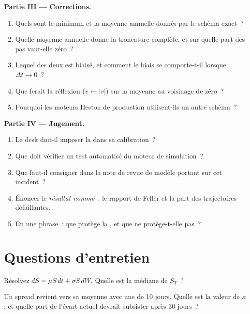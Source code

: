 \begin{problem}
\medskip\noindent\textbf{Partie III --- Corrections.}
\begin{enumerate}[resume]
\item Quels sont le minimum et la moyenne annuelle donnés par le schéma exact~?
\item Quelle moyenne annuelle donne la troncature complète, et sur quelle part des pas vaut-elle zéro~?
\item Lequel des deux est biaisé, et comment le biais se comporte-t-il lorsque $\Delta t \to 0$~?
\item Que ferait la réflexion ($v \leftarrow |v|$) sur la moyenne au voisinage de zéro~?
\item Pourquoi les moteurs Heston de production utilisent-ils un autre schéma~?
\end{enumerate}

\medskip\noindent\textbf{Partie IV --- Jugement.}
\begin{enumerate}[resume]
\item Le desk doit-il imposer la  dans sa calibration~?
\item Que doit vérifier un test automatisé du moteur de simulation~?
\item Que faut-il consigner dans la note de revue de modèle portant sur cet incident~?
\item Énoncer le \emph{résultat nommé}~: le rapport de Feller et la part des trajectoires défaillantes.
\item En une phrase~: que protège la , et que ne protège-t-elle pas~?
\end{enumerate}
\end{problem}

\section{Questions d'entretien}

\begin{interviewq}\label{iq:qm:stochastic-differential-equations:1}
Résolvez $dS = \mu S\,dt + \sigma S\,dW$. Quelle est la médiane de $S_T$~?
\end{interviewq}

\begin{interviewq}\label{iq:qm:stochastic-differential-equations:2}
Un spread revient vers sa moyenne avec une  de 10 jours. Quelle est la valeur de $\kappa$, et quelle part de
l'écart actuel devrait subsister après 30 jours~?
\end{interviewq}

